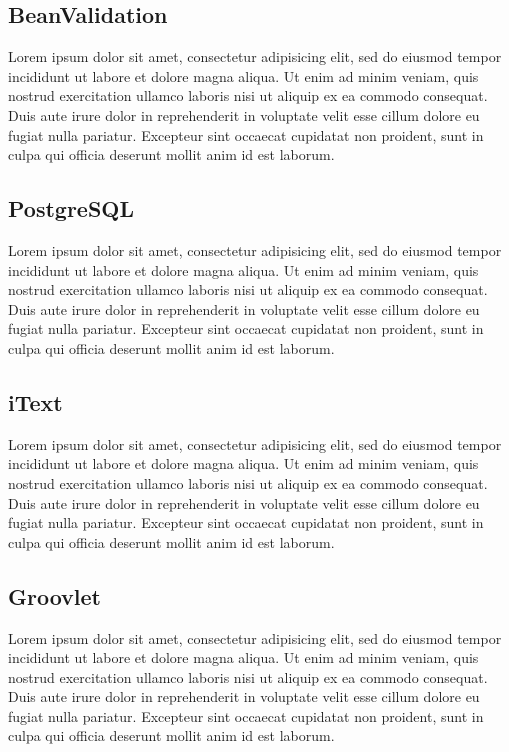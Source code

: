 \documentclass{article}
\begin{document}
\subsection{BeanValidation} %
\label{sub:beanvalidation}
Lorem ipsum dolor sit amet, consectetur adipisicing elit, sed do eiusmod tempor incididunt ut labore et dolore magna aliqua. Ut enim ad minim veniam, quis nostrud exercitation ullamco laboris nisi ut aliquip ex ea commodo consequat. Duis aute irure dolor in reprehenderit in voluptate velit esse cillum dolore eu fugiat nulla pariatur. Excepteur sint occaecat cupidatat non proident, sunt in culpa qui officia deserunt mollit anim id est laborum.

\subsection{PostgreSQL} %
\label{sub:postgresql}
Lorem ipsum dolor sit amet, consectetur adipisicing elit, sed do eiusmod tempor incididunt ut labore et dolore magna aliqua. Ut enim ad minim veniam, quis nostrud exercitation ullamco laboris nisi ut aliquip ex ea commodo consequat. Duis aute irure dolor in reprehenderit in voluptate velit esse cillum dolore eu fugiat nulla pariatur. Excepteur sint occaecat cupidatat non proident, sunt in culpa qui officia deserunt mollit anim id est laborum.

\subsection{iText} %
\label{sub:itext}
Lorem ipsum dolor sit amet, consectetur adipisicing elit, sed do eiusmod tempor incididunt ut labore et dolore magna aliqua. Ut enim ad minim veniam, quis nostrud exercitation ullamco laboris nisi ut aliquip ex ea commodo consequat. Duis aute irure dolor in reprehenderit in voluptate velit esse cillum dolore eu fugiat nulla pariatur. Excepteur sint occaecat cupidatat non proident, sunt in culpa qui officia deserunt mollit anim id est laborum.

\subsection{Groovlet} %
\label{sub:groovlet}
Lorem ipsum dolor sit amet, consectetur adipisicing elit, sed do eiusmod tempor incididunt ut labore et dolore magna aliqua. Ut enim ad minim veniam, quis nostrud exercitation ullamco laboris nisi ut aliquip ex ea commodo consequat. Duis aute irure dolor in reprehenderit in voluptate velit esse cillum dolore eu fugiat nulla pariatur. Excepteur sint occaecat cupidatat non proident, sunt in culpa qui officia deserunt mollit anim id est laborum.
\end{document}
